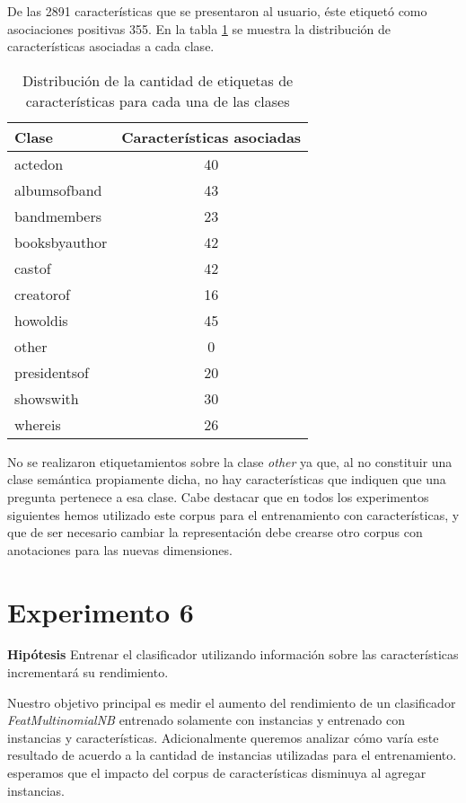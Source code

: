 De las 2891 características que se presentaron al usuario, éste etiquetó como asociaciones positivas 355. En la tabla \ref{dist-feat-corpus} se muestra la distribución de características asociadas a cada clase.

\begin{table}[h]\label{dist-feat-corpus}
\centering
\begin{tabular}{l c}
    Clase & Características asociadas\\ [0.5ex]
    \hline
    actedon & 40 \\ [0.5ex]
    albumsofband & 43 \\ [0.5ex]
    bandmembers &  23 \\ [0.5ex]
    booksbyauthor &  42 \\ [0.5ex]
    castof & 42 \\ [0.5ex]
    creatorof & 16 \\ [0.5ex]
    howoldis & 45 \\ [0.5ex]
    other & 0 \\ [0.5ex]
    presidentsof & 20 \\ [0.5ex]
    showswith & 30 \\ [0.5ex]
    whereis & 26 \\ [0.5ex]
    \hline
\end{tabular}
\caption{Distribución de la cantidad de etiquetas de características para cada una de las clases}
\end{table}

No se realizaron etiquetamientos sobre la clase \textit{other} ya que, al no constituir una clase semántica propiamente dicha, no hay características que indiquen que una pregunta pertenece a esa clase. Cabe destacar que en todos los experimentos siguientes hemos utilizado este corpus para el entrenamiento con características, y que de ser necesario cambiar la representación debe crearse otro corpus con anotaciones para las nuevas dimensiones.

\section{Experimento 6}
\vspace{3 mm}
\textbf{Hipótesis} Entrenar el clasificador utilizando información sobre las características incrementará su rendimiento.
\vspace{3 mm}

Nuestro objetivo principal es medir el aumento del rendimiento de un clasificador \textit{FeatMultinomialNB} entrenado solamente con instancias y entrenado con instancias y características. Adicionalmente queremos analizar cómo varía este resultado de acuerdo a la cantidad de instancias utilizadas para el entrenamiento. esperamos que el impacto del corpus de características disminuya al agregar instancias.

